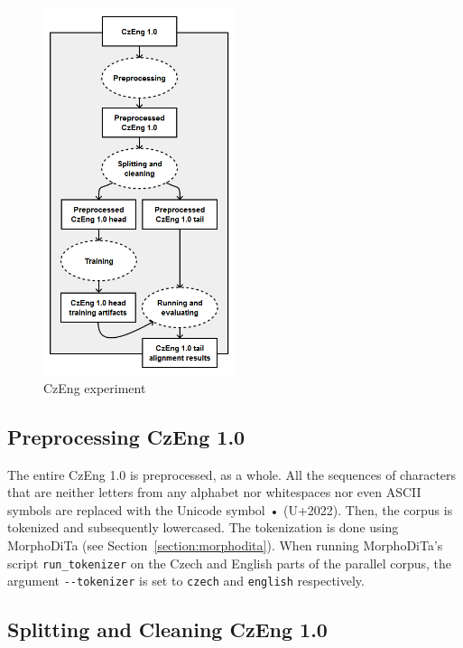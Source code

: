 \begin{figure}[!htb]
	\centering
	\caption{CzEng experiment}
	\label{figure:czeng_experiment}
	\vspace{1em}
	\includegraphics[width=0.50\textwidth]{images/czeng_experiment.png}
\end{figure}

\subsection{Preprocessing CzEng 1.0}
\label{subsection:czeng_experiment_preprocessing}

The entire CzEng 1.0 is preprocessed, as a whole. All the sequences of characters that are neither letters from any alphabet nor whitespaces nor even ASCII symbols are replaced with the Unicode symbol • (U+2022). Then, the corpus is tokenized and subsequently lowercased. The tokenization is done using MorphoDiTa (see Section~\ref{section:morphodita}). When running MorphoDiTa's script \texttt{run\_tokenizer} on the Czech and English parts of the parallel corpus, the argument \texttt{-{}-tokenizer} is set to \texttt{czech} and \texttt{english} respectively.

\subsection{Splitting and Cleaning CzEng 1.0}
\label{subsection:czeng_experiment_cleaning and splitting}

